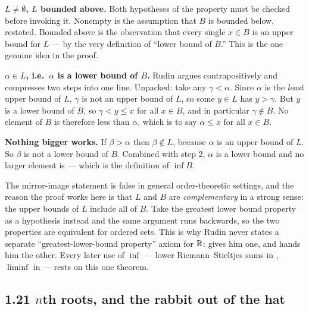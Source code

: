 \documentclass[11pt,twoside]{article}
\begin{document}
\begin{proofwalk}
  \item \textbf{$L \ne \emptyset$, $L$ bounded above.} Both hypotheses of the
        \lub{} property must be checked before invoking it. Nonempty is the
        assumption that $B$ is bounded below, restated. Bounded above is the
        observation that every single $x \in B$ is an upper bound for $L$ ---
        by the very definition of ``lower bound of $B$.'' This is the one genuine
        idea in the proof.
  \item \textbf{$\alpha \in L$, i.e.\ $\alpha$ is a lower bound of $B$.} Rudin
        argues contrapositively and compresses two steps into one line. Unpacked:
        take any $\gamma < \alpha$. Since $\alpha$ is the \emph{least} upper
        bound of $L$, $\gamma$ is not an upper bound of $L$, so some
        $y \in L$ has $y > \gamma$. But $y$ is a lower bound of $B$, so
        $\gamma < y \le x$ for all $x \in B$, and in particular $\gamma \notin B$.
        No element of $B$ is therefore less than $\alpha$, which is to say
        $\alpha \le x$ for all $x \in B$.
  \item \textbf{Nothing bigger works.} If $\beta > \alpha$ then $\beta \notin L$,
        because $\alpha$ is an upper bound of $L$. So $\beta$ is not a lower bound
        of $B$. Combined with step 2, $\alpha$ is a lower bound and no larger
        element is --- which is the definition of $\inf B$.
\end{proofwalk}

\begin{deeper}
The mirror-image statement is false in general order-theoretic settings, and the
reason the proof works here is that $L$ and $B$ are \emph{complementary} in a
strong sense: the upper bounds of $L$ include all of $B$. Take the greatest
lower bound property as a hypothesis instead and the same argument runs
backwards, so the two properties are equivalent for ordered sets. This is why
Rudin never states a separate ``greatest-lower-bound property'' axiom for $\mathbb{R}$:
 gives him one, and  hands him the other. Every later use
of $\inf$ --- lower Riemann--Stieltjes sums in , $\liminf$ in
 --- rests on this one theorem.
\end{deeper}

\subsection*{1.21 \; $n$th roots, and the rabbit out of the hat}
\end{document}
